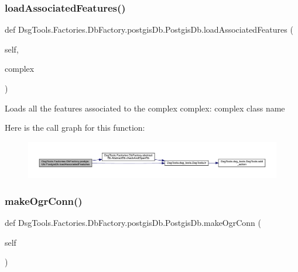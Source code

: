 \subsubsection{\texorpdfstring{load\+Associated\+Features()}{loadAssociatedFeatures()}}
{\footnotesize\ttfamily def Dsg\+Tools.\+Factories.\+Db\+Factory.\+postgis\+Db.\+Postgis\+Db.\+load\+Associated\+Features (\begin{DoxyParamCaption}\item[{}]{self,  }\item[{}]{complex }\end{DoxyParamCaption})}

\begin{DoxyVerb}Loads all the features associated to the complex 
complex: complex class name
\end{DoxyVerb}
 Here is the call graph for this function\+:
\nopagebreak
\begin{figure}[H]
\begin{center}
\leavevmode
\includegraphics[width=350pt]{class_dsg_tools_1_1_factories_1_1_db_factory_1_1postgis_db_1_1_postgis_db_aa4e032bd36092305d6c45568404ee552_cgraph}
\end{center}
\end{figure}
\mbox{\label{class_dsg_tools_1_1_factories_1_1_db_factory_1_1postgis_db_1_1_postgis_db_a41684c4b7f79ba2b21e4bea0c18d7804}} 
\subsubsection{\texorpdfstring{make\+Ogr\+Conn()}{makeOgrConn()}}
{\footnotesize\ttfamily def Dsg\+Tools.\+Factories.\+Db\+Factory.\+postgis\+Db.\+Postgis\+Db.\+make\+Ogr\+Conn (\begin{DoxyParamCaption}\item[{}]{self }\end{DoxyParamCaption})}

